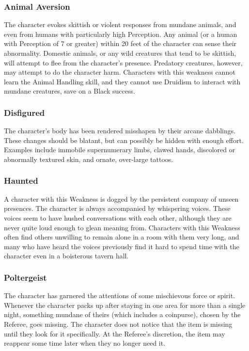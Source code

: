 \documentclass[oneside]{book}
\begin{document}
\begin{multicols}{2}
\subsubsection{Animal Aversion}
The character evokes skittish or violent responses from mundane animals, and even from humans with particularly high Perception. Any animal (or a human with Perception of 7 or greater) within 20 feet of the character can sense their abnormality. Domestic animals, or any wild creatures that tend to be skittish, will attempt to flee from the character's presence. Predatory creatures, however, may attempt to do the character harm. Characters with this weakness cannot learn the Animal Handling skill, and they cannot use Druidism to interact with mundane creatures, save on a Black success. 

\subsubsection{Disfigured}
The character's body has been rendered misshapen by their arcane dabblings. These changes should be blatant, but can possibly be hidden with enough effort. Examples include immobile supernumerary limbs, clawed hands, discolored or abnormally textured skin, and ornate, over-large tattoos. 

\subsubsection{Haunted}
A character with this Weakness is dogged by the persistent company of unseen presences. The character is always accompanied by whispering voices. These voices seem to have hushed conversations with each other, although they are never quite loud enough to glean meaning from. Characters with this Weakness often find others unwilling to remain alone in a room with them very long, and many who have heard the voices previously find it hard to spend time with the character even in a boisterous tavern hall.  

\subsubsection{Poltergeist}
The character has garnered the attentions of some mischievous force or spirit. Whenever the character packs up after staying in one area for more than a single night, something mundane of theirs (which includes a coinpurse), chosen by the Referee, goes missing. The character does not notice that the item is missing until they look for it specifically. At the Referee's discretion, the item may reappear some time later when they no longer need it. 


\end{multicols}
\end{document}
